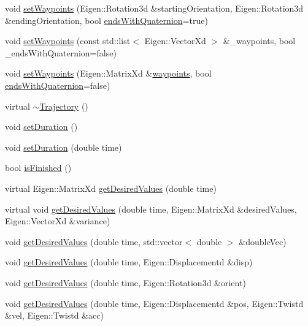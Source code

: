 \begin{DoxyCompactItemize}
\item 
void \hyperlink{classocra_1_1Trajectory_ad787da3056374594ce65df54795deae8}{set\+Waypoints} (Eigen\+::\+Rotation3d \&starting\+Orientation, Eigen\+::\+Rotation3d \&ending\+Orientation, bool \hyperlink{classocra_1_1Trajectory_a4f230978860de9473f83df3b8ae31ad9}{ends\+With\+Quaternion}=true)
\item 
void \hyperlink{classocra_1_1Trajectory_a24754dba11643737f02be0bd7c16023e}{set\+Waypoints} (const std\+::list$<$ Eigen\+::\+Vector\+Xd $>$ \&\+\_\+waypoints, bool \+\_\+ends\+With\+Quaternion=false)
\item 
void \hyperlink{classocra_1_1Trajectory_adde90667693b2648420917e80a39d1e6}{set\+Waypoints} (Eigen\+::\+Matrix\+Xd \&\hyperlink{classocra_1_1Trajectory_ab0514f8c3c8d4827b19dc863ff800b43}{waypoints}, bool \hyperlink{classocra_1_1Trajectory_a4f230978860de9473f83df3b8ae31ad9}{ends\+With\+Quaternion}=false)
\item 
virtual \hyperlink{classocra_1_1Trajectory_aede5bc277bdb4aff286b68c1d7a5d9be}{$\sim$\+Trajectory} ()
\item 
void \hyperlink{classocra_1_1Trajectory_a4e0a8295e1b8eb74cd13f130e5ab1475}{set\+Duration} ()
\item 
void \hyperlink{classocra_1_1Trajectory_abc96649d0b4431608ceb524f9db3b73b}{set\+Duration} (double time)
\item 
bool \hyperlink{classocra_1_1Trajectory_a1d6839b9239d113f6992e84a9cc711d6}{is\+Finished} ()
\item 
virtual Eigen\+::\+Matrix\+Xd \hyperlink{classocra_1_1Trajectory_a2102a829e6dad497f7c773c346d499b7}{get\+Desired\+Values} (double time)
\item 
virtual void \hyperlink{classocra_1_1Trajectory_aab6869cf5bc4a7c44eac36a0e49255b9}{get\+Desired\+Values} (double time, Eigen\+::\+Matrix\+Xd \&desired\+Values, Eigen\+::\+Vector\+Xd \&variance)
\item 
void \hyperlink{classocra_1_1Trajectory_a195921776ed3d3b403dcb8728ee8d02a}{get\+Desired\+Values} (double time, std\+::vector$<$ double $>$ \&double\+Vec)
\item 
void \hyperlink{classocra_1_1Trajectory_a5e9026bd9eb9a50f820fd561d7783c59}{get\+Desired\+Values} (double time, Eigen\+::\+Displacementd \&disp)
\item 
void \hyperlink{classocra_1_1Trajectory_a05e7abae6b5dead3d5382bef15d0c803}{get\+Desired\+Values} (double time, Eigen\+::\+Rotation3d \&orient)
\item 
void \hyperlink{classocra_1_1Trajectory_af81c6d351f25f49ae02028d0ee9b34bd}{get\+Desired\+Values} (double time, Eigen\+::\+Displacementd \&pos, Eigen\+::\+Twistd \&vel, Eigen\+::\+Twistd \&acc)

\end{DoxyCompactItemize}
